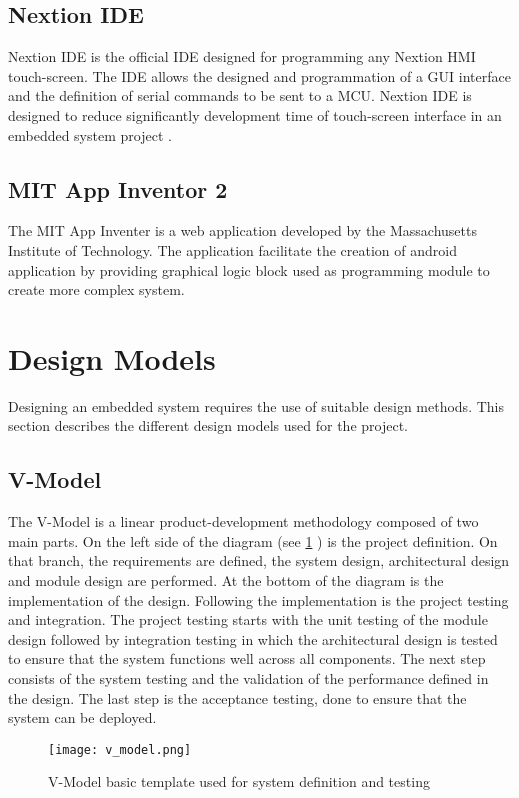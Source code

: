 \subsection{Nextion IDE}\label{nextion}
Nextion IDE is the official IDE designed for programming any Nextion HMI touch-screen. The IDE allows the designed and programmation of a GUI interface and the definition of serial commands to be sent to a MCU. Nextion IDE is designed to reduce significantly development time of touch-screen interface in an embedded system project \cite{nextion}. 

\subsection{MIT App Inventor 2}
The MIT App Inventer is a web application developed by the Massachusetts Institute of Technology. The application facilitate the creation of android application by providing graphical logic block used as programming module to create more complex system.   

\section{Design Models}
Designing an embedded system requires the use of suitable design methods. This section describes the different design models used for the project.

\subsection{V-Model}
The V-Model is a linear product-development methodology composed of two main parts. On the left side of the diagram (see \cref{fig:v_model} ) is the project definition. On that branch, the requirements are defined, the system design, architectural design and module design are performed. At the bottom of the diagram is the implementation of the design. Following the implementation is the project testing and integration. The project testing starts with the unit testing of the module design followed by integration testing in which the architectural design is tested to ensure that the system functions well across all components. The next step consists of the system testing and the validation of the performance defined in the design. The last step is the acceptance testing, done to ensure that the system can be deployed.       
\begin{figure}[ht]
\centering
\texttt{[image: v\_model.png]}
\caption{V-Model basic template used for system definition and testing}
\label{fig:v_model}
\end{figure}

